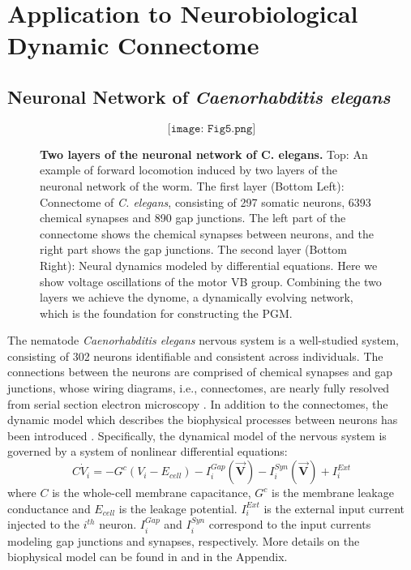 \documentclass[letterpaper,11pt]{article}
\begin{document}
\section{Application to Neurobiological Dynamic Connectome}
\subsection{Neuronal Network of \textit{Caenorhabditis elegans}}
\begin{figure}[h!]
  \[\texttt{[image: Fig5.png]}\]
  \caption{\textbf{Two layers of the neuronal network of C. elegans.} Top: An example of forward locomotion induced by two layers of the neuronal network of the worm. The first layer (Bottom Left): Connectome of \textit{C. elegans}, consisting of 297 somatic neurons, 6393 chemical synapses and 890 gap junctions. The left part of the connectome shows the chemical synapses between neurons, and the right part shows the gap junctions. The second layer (Bottom Right): Neural dynamics modeled by differential equations. Here we show voltage oscillations of the motor VB group. Combining the two layers we achieve the dynome, a dynamically evolving network, which is the foundation for constructing the PGM.}
\end{figure}

The nematode \textit{Caenorhabditis elegans} nervous system is a well-studied system, consisting of 302 neurons identifiable and consistent across individuals. The connections between the neurons are comprised of chemical synapses and gap junctions, whose wiring diagrams, i.e., connectomes, are nearly fully resolved from serial section electron microscopy \cite{connectome}. In addition to the connectomes, the dynamic model which describes the biophysical processes between neurons has been introduced \cite{dynome}. Specifically, the dynamical model of the nervous system is governed by a system of nonlinear differential equations:
\[C\dot{V}_i=-G^c(V_i-E_{cell})-I_i^{Gap}(\overrightarrow{\textbf{V}})-I_i^{Syn}(\overrightarrow{\textbf{V}})+I_i^{Ext}\]
where $C$ is the whole-cell membrane capacitance, $G^c$ is the membrane leakage conductance and $E_{cell}$ is the leakage potential. $I_i^{Ext}$ is the external input current injected to the $i^{th}$ neuron. $I_i^{Gap}$ and $I_i^{Syn}$ correspond to the input currents modeling gap junctions and synapses, respectively. More details on the biophysical model can be found in \cite{dynome} and in the Appendix.
\end{document}
